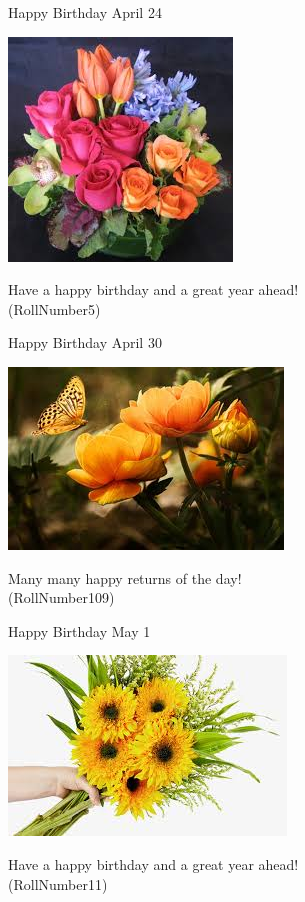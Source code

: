 \documentclass[table, landscape]{beamer}
\begin{document}
\begin{frame}{\color{red}Happy Birthday }
{April 24}
\begin{center}
\includegraphics[height=0.5\textheight]{flowers/f9.jpeg}

Have a happy birthday and a great year ahead! \\ \vspace{0.5cm}{\Large name5} (RollNumber5)
\end{center}
\end{frame}
\begin{frame}{\color{blue}Happy Birthday }
{April 30}
\begin{center}
\includegraphics[height=0.5\textheight]{flowers/f7.jpeg}

Many many happy returns of the day! \\ \vspace{0.5cm}{\Large name102} (RollNumber109)
\end{center}
\end{frame}
\begin{frame}{\color{blue}Happy Birthday }
{May 1}
\begin{center}
\includegraphics[height=0.5\textheight]{flowers/f6.jpeg}

Have a happy birthday and a great year ahead! \\ \vspace{0.5cm}{\Large name6} (RollNumber11)
\end{center}
\end{frame}
\end{document}
